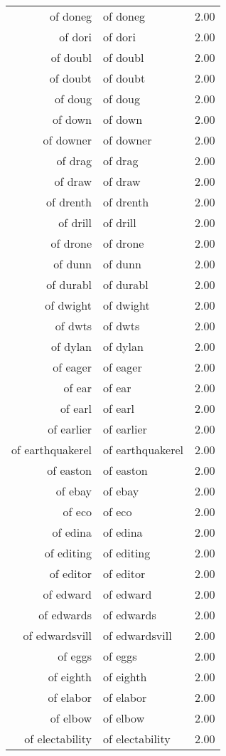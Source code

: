 \begin{table}[ht]
\begin{tabular}{rlr}
  of doneg & of doneg & 2.00 \\ 
  of dori & of dori & 2.00 \\ 
  of doubl & of doubl & 2.00 \\ 
  of doubt & of doubt & 2.00 \\ 
  of doug & of doug & 2.00 \\ 
  of down & of down & 2.00 \\ 
  of downer & of downer & 2.00 \\ 
  of drag & of drag & 2.00 \\ 
  of draw & of draw & 2.00 \\ 
  of drenth & of drenth & 2.00 \\ 
  of drill & of drill & 2.00 \\ 
  of drone & of drone & 2.00 \\ 
  of dunn & of dunn & 2.00 \\ 
  of durabl & of durabl & 2.00 \\ 
  of dwight & of dwight & 2.00 \\ 
  of dwts & of dwts & 2.00 \\ 
  of dylan & of dylan & 2.00 \\ 
  of eager & of eager & 2.00 \\ 
  of ear & of ear & 2.00 \\ 
  of earl & of earl & 2.00 \\ 
  of earlier & of earlier & 2.00 \\ 
  of earthquakerel & of earthquakerel & 2.00 \\ 
  of easton & of easton & 2.00 \\ 
  of ebay & of ebay & 2.00 \\ 
  of eco & of eco & 2.00 \\ 
  of edina & of edina & 2.00 \\ 
  of editing & of editing & 2.00 \\ 
  of editor & of editor & 2.00 \\ 
  of edward & of edward & 2.00 \\ 
  of edwards & of edwards & 2.00 \\ 
  of edwardsvill & of edwardsvill & 2.00 \\ 
  of eggs & of eggs & 2.00 \\ 
  of eighth & of eighth & 2.00 \\ 
  of elabor & of elabor & 2.00 \\ 
  of elbow & of elbow & 2.00 \\ 
  of electability & of electability & 2.00 \\ 

\end{tabular}
\end{table}
